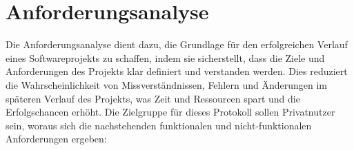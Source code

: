 \chapter{Anforderungsanalyse}




Die Anforderungsanalyse dient dazu, die Grundlage für den erfolgreichen Verlauf eines Softwareprojekts 
zu schaffen, indem sie sicherstellt, dass die Ziele und Anforderungen des Projekts klar definiert 
und verstanden werden. Dies reduziert die Wahrscheinlichkeit von Missverständnissen, Fehlern und 
Änderungen im späteren Verlauf des Projekts, was Zeit und Ressourcen spart und die Erfolgschancen erhöht.
Die Zielgruppe für dieses Protokoll sollen Privatnutzer sein, woraus sich die nachstehenden funktionalen 
und nicht-funktionalen Anforderungen ergeben:



